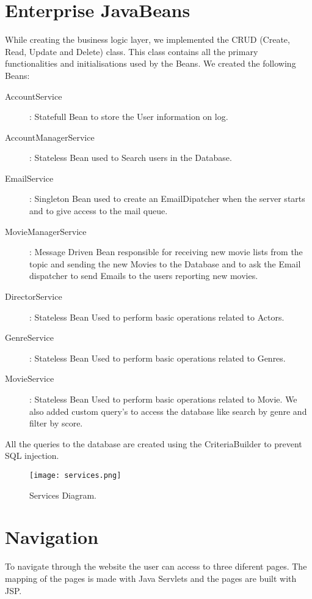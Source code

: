 \documentclass[12pt]{article}
\begin{document}
\section{Enterprise JavaBeans}
\indent \indent While creating the business logic layer, we implemented the CRUD (Create, Read, Update and Delete) class. This class contains all the primary functionalities and initialisations used by the Beans.
We created the following Beans:
\begin{description}
	\item [AccountService]: Statefull Bean to store the User information on log.

	\item [AccountManagerService]: Stateless Bean used to Search users in the Database.

	\item [EmailService]: Singleton Bean used to create an EmailDipatcher when the server starts and to give access to the mail queue.

	\item [MovieManagerService]: Message Driven Bean responsible for receiving new movie lists from the topic and sending the new Movies to the Database and to ask the Email dispatcher to send Emails to the users reporting new movies.

	\item [DirectorService]: Stateless Bean Used to perform basic operations related to Actors.

	\item [GenreService]: Stateless Bean Used to perform basic operations related to Genres.

	\item [MovieService]: Stateless Bean Used to perform basic operations related to Movie. We also added custom query’s to access the database like search by genre and filter by score.
\end{description}
All the queries to the database are created using the CriteriaBuilder to prevent SQL injection.

\begin{figure}[h!]
	\centering
	\texttt{[image: services.png]}
	\caption{Services Diagram.}
\end{figure}

\clearpage

\section{Navigation}
\indent \indent To navigate through the website the user can access to three diferent pages. The mapping of the pages is made with Java Servlets and the pages are built with JSP.
\end{document}
